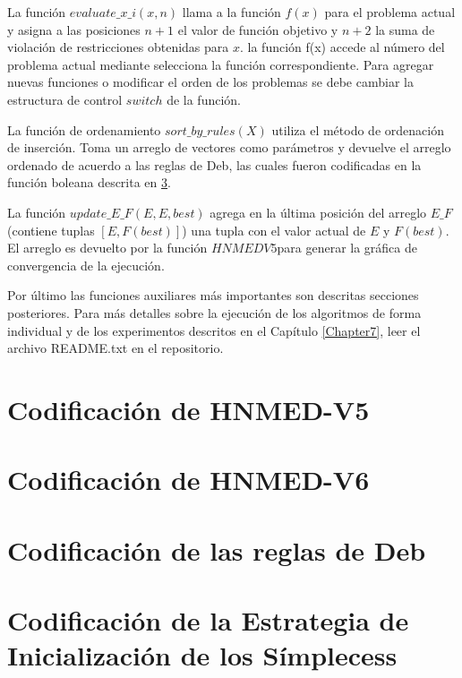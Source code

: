  La función $evaluate\_x\_i(x,n)$ llama a la función $f(x)$ para el problema actual y asigna a las posiciones $n+1$ el valor de función objetivo y $n+2$ la suma de violación de restricciones obtenidas para  $x$. la función f(x) accede al número del problema actual mediante selecciona la función correspondiente. Para agregar nuevas funciones o modificar el orden de los problemas se debe cambiar la estructura de control $switch$ de la función.
 
 La función de ordenamiento $sort\_by\_rules(X)$ utiliza el método de ordenación de inserción. Toma un arreglo de vectores como parámetros y devuelve el arreglo ordenado de acuerdo a las reglas de Deb, las cuales fueron codificadas en la función boleana descrita en \ref{sec:Debs rules}.
 
 La función $update\_E\_F(E,E,best)$ agrega en la última posición del arreglo $E\_F$(contiene tuplas $\left[ E,F(best)\right]$) una tupla con el valor actual de $E$ y $F(best)$. El arreglo es devuelto por la función $HNMEDV5$para generar la gráfica de convergencia de la ejecución.
 
Por último las funciones auxiliares más importantes son descritas secciones posteriores. Para más detalles sobre la ejecución de los algoritmos de forma individual y de los experimentos descritos en el Capítulo \ref{Chapter7}, leer el archivo README.txt en el repositorio.     
 
\section{Codificación de HNMED-V5 }

\section{Codificación de HNMED-V6 }

\section{Codificación de las reglas de Deb}\label{sec:Debs rules}

\section{Codificación de la Estrategia de Inicialización de los Símplecess}

